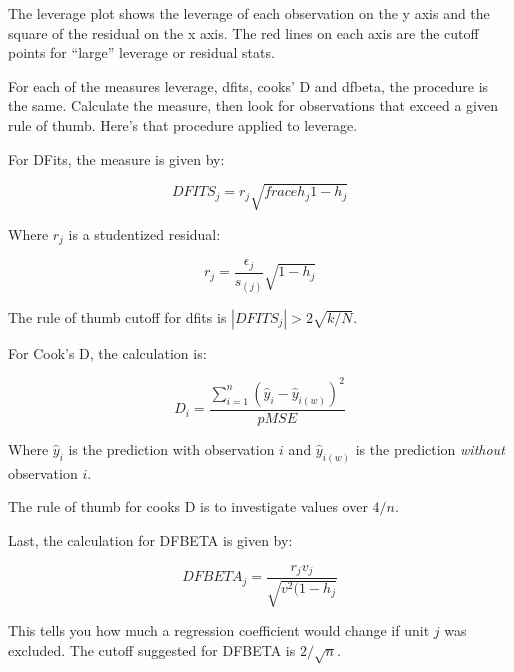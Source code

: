 \documentclass[12pt]{article}
\begin{document}
The leverage plot shows the leverage of each observation on the y axis
and the square of the residual on the x axis. The red lines on each
axis are the cutoff points for ``large'' leverage or residual stats. 

For each of the measures leverage, dfits, cooks' D and dfbeta, the
procedure is the same. Calculate the measure, then look for
observations that exceed a given rule of thumb. Here's that procedure
applied to leverage. 

For DFits, the measure is given by:

\begin{equation*}
  DFITS_j=r_j\sqrt{frace{h_j}{1-h_j}}
\end{equation*}

Where $r_j$ is a studentized residual:

\begin{equation*}
  r_j=\frac{\epsilon_j}{s_{(j)}}\sqrt{1-h_j}
\end{equation*}

The rule of thumb cutoff for dfits is $|{DFITS_j}|>2 \sqrt{k/N}$.

For Cook's D, the calculation is:

\begin{equation*}
  D_i=\frac{\sum_{i=1}^n(\hat{y}_i-\hat{y}_{i(w)})^2}{p MSE}
\end{equation*}

Where $\hat{y}_i$ is the prediction with observation $i$ and
$\hat{y}_{i(w)}$ is the prediction \emph{without} observation $i$. 

The rule of thumb for cooks D is to investigate values over $4/n$. 

Last, the calculation for DFBETA is given by: 

\begin{equation*}
  DFBETA_j=\frac{r_jv_j}{\sqrt{v^2(1-h_j}}
\end{equation*}

This tells you how much a regression coefficient would change if unit
$j$ was excluded. The cutoff suggested for DFBETA is $2/\sqrt{n}$. 
\end{document}
